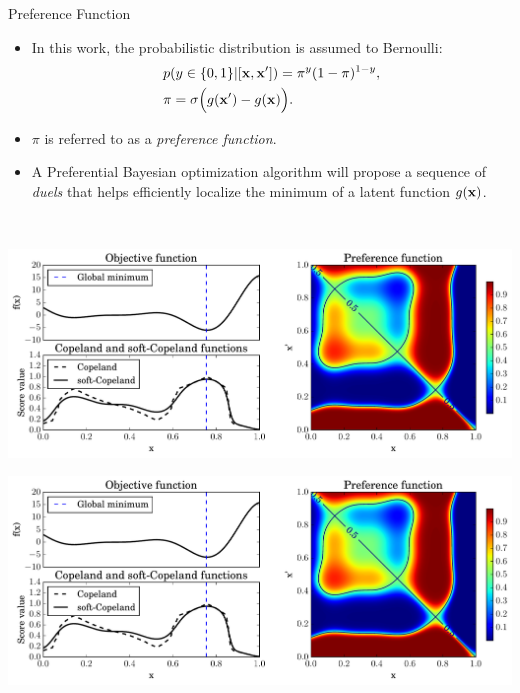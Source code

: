 \documentclass[13pt,aspectratio=1610]{beamer}
\begin{document}
\begin{frame}{Preference Function}
\begin{minipage}{0.5\textwidth}
\begin{itemize}
\item In this work, the probabilistic distribution is assumed to Bernoulli: \\
\begin{align*} &p(y \in \{0,1\} | [{\bf x},{\bf x}'])= \pi^y(1-\pi)^{1-y},\\ 
&\pi = \sigma\Big(g({\bf x}') - g({\bf x})\Big).
\end{align*}
\item $\pi$ is referred to as a \emph{preference function}.
\item A Preferential Bayesian optimization algorithm will propose a sequence of \emph{duels} that helps efficiently localize the minimum of a latent function $g( {\bf x})$.
\end{itemize}
\end{minipage}
~
\begin{minipage}{.45\textwidth}
\centering 

\includegraphics[width=.9\textwidth]{forrester.pdf}

\includegraphics[width=.9\textwidth]{duel_space.pdf} 
\end{minipage}

\end{frame}

%
\end{document}
